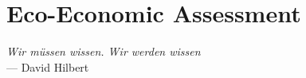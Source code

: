 \chapter{Eco-Economic Assessment}\label{ch:scenarioB} 

\begin{flushright}{\slshape
    Wir m\"ussen wissen. Wir werden wissen} \\ \medskip
    --- David Hilbert
\end{flushright}

